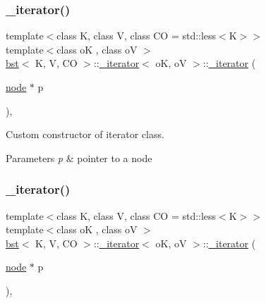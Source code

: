 \subsubsection{\texorpdfstring{\+\_\+iterator()}{\_iterator()}\hspace{0.1cm}{\footnotesize\ttfamily [1/2]}}
{\footnotesize\ttfamily template$<$class K, class V, class CO = std\+::less$<$\+K$>$$>$ \\
template$<$class oK , class oV $>$ \\
\hyperlink{classbst}{bst}$<$ K, V, CO $>$\+::\hyperlink{classbst_1_1__iterator}{\+\_\+iterator}$<$ oK, oV $>$\+::\hyperlink{classbst_1_1__iterator}{\+\_\+iterator} (\begin{DoxyParamCaption}\item[{\hyperlink{structbst_1_1node}{node} $\ast$}]{p }\end{DoxyParamCaption})\hspace{0.3cm}{\ttfamily [inline]}, {\ttfamily [explicit]}}



Custom constructor of iterator class. 


\begin{DoxyParams}{Parameters}
{\em p} & pointer to a node \\
\hline
\end{DoxyParams}
\mbox{\label{classbst_1_1__iterator_a9c4c33751d4d0a8484855b48acd730a2}} 
\subsubsection{\texorpdfstring{\+\_\+iterator()}{\_iterator()}\hspace{0.1cm}{\footnotesize\ttfamily [2/2]}}
{\footnotesize\ttfamily template$<$class K, class V, class CO = std\+::less$<$\+K$>$$>$ \\
template$<$class oK , class oV $>$ \\
\hyperlink{classbst}{bst}$<$ K, V, CO $>$\+::\hyperlink{classbst_1_1__iterator}{\+\_\+iterator}$<$ oK, oV $>$\+::\hyperlink{classbst_1_1__iterator}{\+\_\+iterator} (\begin{DoxyParamCaption}\item[{\hyperlink{structbst_1_1node}{node} $\ast$}]{p }\end{DoxyParamCaption})\hspace{0.3cm}{\ttfamily [inline]}, {\ttfamily [explicit]}}



